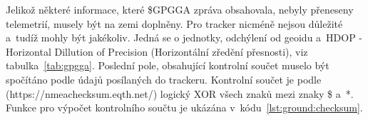 \documentclass[twoside]{ctuthesis}
\theoremstyle{plain}
\theoremstyle{definition}
\theoremstyle{note}
\begin{document}
	

	

	Jelikož některé informace, které \$GPGGA zpráva obsahovala, nebyly přeneseny telemetrií, musely být na zemi doplněny. Pro tracker nicméně nejsou důležité a~tudíž mohly být jakékoliv. Jedná se o jednotky, odchýlení od geoidu a~HDOP - Horizontal Dillution of Precision (Horizontální zředění přesnosti), viz tabulka~\ref{tab:gpgga}. Poslední pole, obsahující kontrolní součet muselo být spočítáno podle údajů posílaných do trackeru. Kontrolní součet je podle (https://nmeachecksum.eqth.net/) logický XOR všech znaků mezi znaky \$ a~*. Funkce pro výpočet kontrolního součtu je ukázána v~kódu~\ref{lst:ground:checksum}.

	

\end{document}
